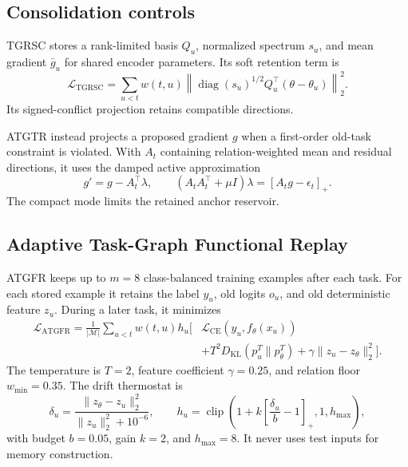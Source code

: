 \documentclass[conference]{IEEEtran}
\newcommand{\ATGFR}{\textsc{ATGFR}}
\newcommand{\TGRSC}{\textsc{TGRSC}}
\newcommand{\ATGTR}{\textsc{ATGTR}}
\begin{document}
\subsection{Consolidation controls}

\TGRSC{} stores a rank-limited basis \(Q_u\), normalized spectrum \(s_u\), and
mean gradient \(\bar g_u\) for shared encoder parameters. Its soft retention
term is
\begin{equation}
\mathcal{L}_{\mathrm{TGRSC}}=
\sum_{u<t}w(t,u)
\left\|\operatorname{diag}(s_u)^{1/2}
Q_u^\top(\theta-\theta_u)\right\|_2^2.
\end{equation}
Its signed-conflict projection retains compatible directions.

\ATGTR{} instead projects a proposed gradient \(g\) when a first-order
old-task constraint is violated. With \(A_t\) containing relation-weighted
mean and residual directions, it uses the damped active approximation
\begin{equation}
g'=g-A_t^\top\lambda,\qquad
(A_tA_t^\top+\mu I)\lambda=[A_tg-\epsilon_t]_+.
\end{equation}
The compact mode limits the retained anchor reservoir.

\subsection{Adaptive Task-Graph Functional Replay}

\ATGFR{} keeps up to \(m=8\) class-balanced training examples after each task.
For each stored example it retains the label \(y_u\), old logits \(o_u\), and
old deterministic feature \(z_u\). During a later task, it minimizes
\begin{equation}
\begin{split}
\mathcal{L}_{\mathrm{ATGFR}}=
\frac{1}{|\mathcal{M}|}\sum_{u<t}w(t,u)h_u\big[&
\mathcal{L}_{\mathrm{CE}}(y_u,f_\theta(x_u))\\
&+T^2D_{\mathrm{KL}}(p_u^T\|p_\theta^T)
+\gamma\|z_u-z_\theta\|_2^2\big].
\end{split}
\label{eq:atgfr}
\end{equation}
The temperature is \(T=2\), feature coefficient \(\gamma=0.25\), and relation
floor \(w_{\min}=0.35\). The drift thermostat is
\begin{equation}
\delta_u=\frac{\|z_\theta-z_u\|_2^2}{\|z_u\|_2^2+10^{-6}},\qquad
h_u=\operatorname{clip}\left(1+k\left[\frac{\delta_u}{b}-1\right]_+,
1,h_{\max}\right),
\label{eq:thermostat}
\end{equation}
with budget \(b=0.05\), gain \(k=2\), and \(h_{\max}=8\). It never uses
test inputs for memory construction.
\end{document}
